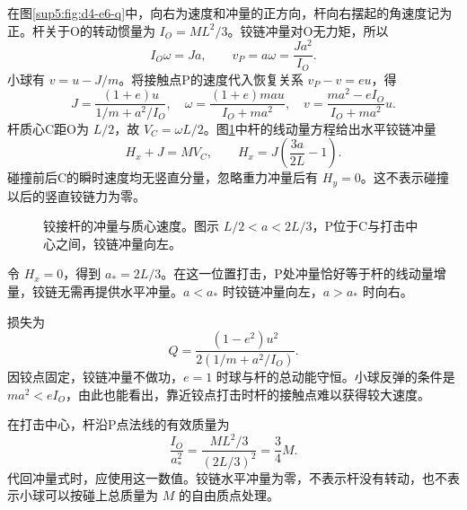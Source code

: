 \begin{solution}
在图\ref{sup5:fig:d4-e6-q}中，向右为速度和冲量的正方向，杆向右摆起的角速度记为正。杆关于O的转动惯量为 $I_O=ML^2/3$。铰链冲量对O无力矩，所以
\begin{equation}
 I_O\omega=Ja,\qquad v_P=a\omega=\frac{Ja^2}{I_O}.
\end{equation}
小球有 $v=u-J/m$。将接触点P的速度代入恢复关系 $v_P-v=eu$，得
\begin{equation}
 J=\frac{(1+e)u}{1/m+a^2/I_O},\quad
 \omega=\frac{(1+e)mau}{I_O+ma^2},\quad
 v=\frac{ma^2-eI_O}{I_O+ma^2}u.
\end{equation}
杆质心C距O为 $L/2$，故 $V_C=\omega L/2$。图\ref{sup5:fig:d4-e6-s}中杆的线动量方程给出水平铰链冲量
\begin{equation}
 H_x+J=MV_C,\qquad
 H_x=J\left(\frac{3a}{2L}-1\right).
\end{equation}
碰撞前后C的瞬时速度均无竖直分量，忽略重力冲量后有 $H_y=0$。这不表示碰撞以后的竖直铰链力为零。
\begin{figure}[H]\centering
{}
\caption{铰接杆的冲量与质心速度。图示 $L/2<a<2L/3$，P位于C与打击中心之间，铰链冲量向左。}\label{sup5:fig:d4-e6-s}
\end{figure}
令 $H_x=0$，得到 $a_*=2L/3$。在这一位置打击，P处冲量恰好等于杆的线动量增量，铰链无需再提供水平冲量。$a<a_*$ 时铰链冲量向左，$a>a_*$ 时向右。

损失为
\begin{equation}
 Q=\frac{(1-e^2)u^2}{2(1/m+a^2/I_O)}.
\end{equation}
因铰点固定，铰链冲量不做功，$e=1$ 时球与杆的总动能守恒。小球反弹的条件是 $ma^2<eI_O$，由此也能看出，靠近铰点打击时杆的接触点难以获得较大速度。

在打击中心，杆沿P点法线的有效质量为
\[
\frac{I_O}{a_*^2}
=\frac{ML^2/3}{(2L/3)^2}=\frac34M.
\]
代回冲量式时，应使用这一数值。铰链水平冲量为零，不表示杆没有转动，也不表示小球可以按碰上总质量为 $M$ 的自由质点处理。

\end{solution}



